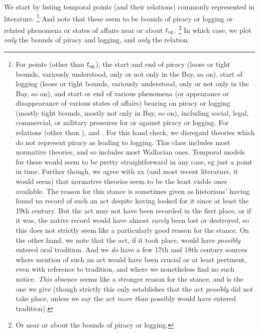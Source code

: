 		We start by listing temporal points (and their relations) commonly represented in literature.%
		\footnote{For points (other than \(t_{\operatorname{og}}\)), the start and end of piracy (loose or tight bounds,  variously understood, only or not only in the Bay, so on), start of logging (loose or tight bounds,  variously understood, only or not only in the Bay, so on), and start or end of various phenomena (or appearance or disappearance of various states of affairs) bearing on piracy or logging (mostly tight bounds, mostly not only in Bay, so on), including social, legal, commercial, or military pressures for or against piracy or logging. For relations (other than ),  and . For this hand check, we disregard theories which do not represent piracy as leading to logging. This class includes most normative theories, and so includes most Wallacian ones. Temporal models for these would seem to be pretty straightforward in any case, eg just a point in time. Further though, we agree with xx (and most recent literature, it would seem) that normative theories seem to be the least viable ones available. The reason for this stance is sometimes given as historians' having found no record of such an act despite having looked for it since at least the 19th century. But the act may not have been recorded in the first place, or if it was, the native record would have almost \emph{surely} been lost or destroyed, so this does not strictly seem like a particularly good reason for the stance. On the other hand, we note that the act, if it took place, would have \emph{possibly} entered oral tradition. And we \emph{do} have a few 17th and 18th century sources where mention of such an act would have been crucial or at least pertinent, even with reference to tradition, and where we nonetheless find no such notice. \emph{This} absence seems like a stronger reason for the stance, and is the one we give (though strictly this only establishes that the act \emph{possibly} did not take place, unless we say the act \emph{more than} possibly would have entered tradition).} %
		And note that these seem to be bounds of piracy or logging or related phenomena or states of affairs near or about \(t_{\operatorname{og}}\).%
		\footnote{Or near or about the bounds of piracy or logging.}
		In which case, we plot \emph{only} the bounds of piracy and logging, and \emph{only} the  relation.%

